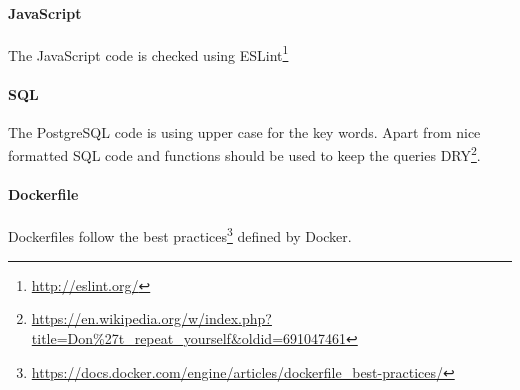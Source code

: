 \paragraph{JavaScript} The JavaScript code is checked using ESLint\footnote{\url{http://eslint.org/}}

\paragraph{SQL} The PostgreSQL code is using upper case for the key words. Apart from nice formatted SQL code and functions should be used
to keep the queries DRY\footnote{\url{https://en.wikipedia.org/w/index.php?title=Don%27t_repeat_yourself&oldid=691047461}}.

\paragraph{Dockerfile} Dockerfiles follow the best practices\footnote{\url{https://docs.docker.com/engine/articles/dockerfile\_best-practices/}} defined by Docker.

